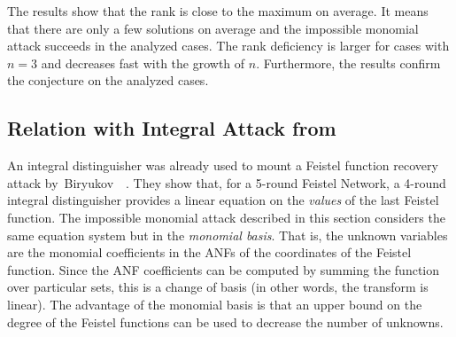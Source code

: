 
The results show that the rank is close to the maximum on average. It means that there are only a few solutions on average and the impossible monomial attack succeeds in the analyzed cases. The rank deficiency is larger for cases with $n=3$ and decreases fast with the growth of $n$. Furthermore, the results confirm the conjecture on the analyzed cases.


\subsection{Relation with Integral Attack from~\cite{LeoFeistel}}

An integral distinguisher was already used to mount a Feistel function recovery attack by~Biryukov~\etal{}~\cite{LeoFeistel}. They show that, for a 5-round Feistel Network, a 4-round integral distinguisher provides a linear equation on the \emph{values} of the last Feistel function.
The impossible monomial attack described in this section considers the same equation system but in the \emph{monomial basis}. That is, the unknown variables are the monomial coefficients in the ANFs of the coordinates of the Feistel function. Since the ANF coefficients can be computed by summing the function over particular sets, this is a change of basis (in other words, the \Mobius{} transform is linear).
The advantage of the monomial basis is that an upper bound on the degree of the Feistel functions can be used to decrease the number of unknowns.


